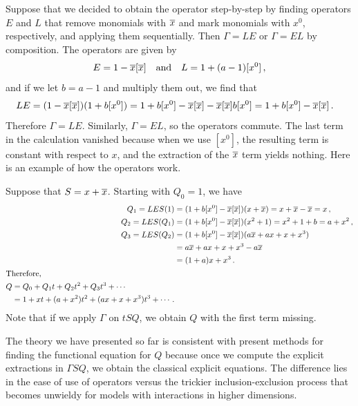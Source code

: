 Suppose that we decided to obtain the operator step-by-step by finding operators $E$ and $L$ that remove monomials with $\overline{x}$ and mark monomials with $x^0$, respectively, and applying them sequentially. Then $\Gamma = LE$ or $\Gamma = EL$ by composition. The operators are given by
\begin{align}
	E = 1- \overline{x} [\overline{x}]\quad\text{and}\quad L = 1 + (a-1)[x^0]\,,
\end{align}
and if we let $b = a-1$ and multiply them out, we find that
\begin{align}
	LE &= (1 - \overline{x}[\overline{x}])(1 + b[x^0]) = 1 + b[x^0] - \overline{x}[\overline{x}]-\overline{x}[\overline{x}]b[x^0] = 1 + b[x^0] -\overline{x}[\overline{x}]\,.
\end{align}
Therefore $\Gamma = LE$. Similarly, $\Gamma = EL$, so the operators commute. The last term in the calculation vanished because when we use $[x^0]$, the resulting term is constant with respect to $x$, and the extraction of the $\overline{x}$ term yields nothing. Here is an example of how the operators work.
\begin{exa}Suppose that $S = x + \overline{x}$. Starting with $Q_0 = 1$, we have
\begin{align}
	Q_1 = LES(1) &= (1 + b[x^0]-\overline{x}[\overline{x}])(x + \overline{x}) = x + \overline{x}-\overline{x}= x\,,\\
	Q_2 = LES(Q_1) &=  (1 + b[x^0]-\overline{x}[\overline{x}])(x^2 + 1) = x^2 + 1 + b = a + x^2\,,\\
	Q_3 = LES(Q_2) &=  (1 + b[x^0]-\overline{x}[\overline{x}])(a\overline{x} + ax + x + x^3) \nonumber\\
		&= a\overline{x} + ax + x + x^3 -a\overline{x}\nonumber\\
		&= (1 + a)x + x^3\,.\\
	\shortintertext{Therefore,}
	\begin{split}
		Q &= Q_0 + Q_1 t + Q_2 t^2 + Q_3t^3 + \cdots\\
		&= 1 + xt + (a + x^2)t^2 + (ax + x + x^3)t^3 + \cdots\,.
	\end{split}
\end{align}
Note that if we apply $\Gamma$ on $t SQ$, we obtain $Q$ with the first term missing.
\end{exa}
The theory we have presented so far is consistent with present methods for finding the functional equation for $Q$ because once we compute the explicit extractions in $\Gamma S Q$, we obtain the classical explicit equations. The difference lies in the ease of use of operators versus the trickier inclusion-exclusion process that becomes unwieldy for models with interactions in higher dimensions.

